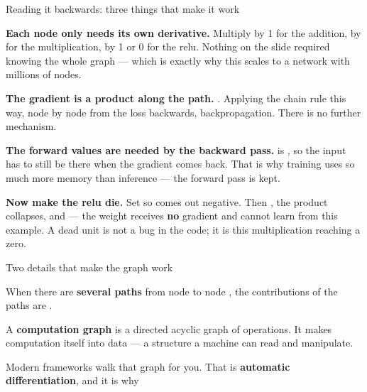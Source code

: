 \documentclass[aspectratio=169,11pt,t]{beamer}
\begin{document}
\begin{frame}[shrink=25]{Reading it backwards: three things that make it work}
\begin{isteps}
\item \textbf{Each node only needs its own derivative.} Multiply by 1 for the addition, by  for the multiplication, by 1 or 0 for the relu. Nothing on the slide required knowing the whole graph --- which is exactly why this scales to a network with millions of nodes.
\item \textbf{The gradient is a product along the path.} . Applying the chain rule this way, node by node from the loss backwards,  backpropagation. There is no further mechanism.
\item \textbf{The forward values are needed by the backward pass.}  is , so the input has to still be there when the gradient comes back. That is why training uses so much more memory than inference --- the forward pass is kept.
\end{isteps}
\begin{iband}[amber]
\textbf{Now make the relu die.} Set  so  comes out negative. Then , the product collapses, and  --- the weight receives \textbf{no} gradient and cannot learn from this example. A dead unit is not a bug in the code; it is this multiplication reaching a zero.
\end{iband}
\end{frame}

\begin{frame}[shrink=25]{Two details that make the graph work}
\begin{ibullets}
\item When there are \textbf{several paths} from node  to node , the contributions of the paths are .
\item A \textbf{computation graph} is a directed acyclic graph of operations. It makes computation itself into data --- a structure a machine can read and manipulate.
\end{ibullets}
\begin{iband}[signal]
Modern frameworks walk that graph for you. That is \textbf{automatic differentiation}, and it is why 
\end{iband}
\end{frame}
\end{document}
